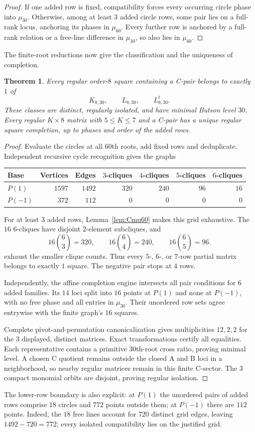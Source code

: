 \documentclass[11pt,a4paper]{article}
\newtheorem{theorem}{Theorem}[section]
\theoremstyle{plain}
\theoremstyle{definition}
\numberwithin{equation}{section}
\begin{document}
\begin{proof}
If one added row is fixed, compatibility forces every occurring circle phase into $\mu_{30}$. Otherwise, among at least $3$ added circle rows, some pair lies on a full-rank locus, anchoring its phases in $\mu_{60}$. Every further row is anchored by a full-rank relation or a free-line difference in $\mu_{30}$, so also lies in $\mu_{60}$.
\end{proof}
The finite-root reductions now give the classification and the uniqueness of completion.
\begin{theorem}\label{thm:Ccomplete}\label{cor:Cunique}
Every regular order-$8$ square containing a C-pair belongs to exactly $1$ of
$$K_{8,30},\qquad L_{8,30},\qquad L_{8,30}^{t}.$$
These classes are distinct, regularly isolated, and have minimal Butson level $30$. Every regular $K\times8$ matrix with $5\le K\le7$ and a C-pair has a unique regular square completion, up to phases and order of the added rows.
\end{theorem}
\begin{proof}
Evaluate the circles at all $60$th roots, add fixed rows and deduplicate. Independent recursive cycle recognition gives the graphs
\begin{center}\begin{tabular}{lrrrrrr}\toprule
Base&Vertices&Edges&$3$-cliques&$4$-cliques&$5$-cliques&$6$-cliques\\\midrule
$P(1)$&$1597$&$1492$&$320$&$240$&$96$&$16$\\
$P(-1)$&$372$&$112$&$0$&$0$&$0$&$0$\\\bottomrule
\end{tabular}\end{center}
For at least $3$ added rows, Lemma~\ref{lem:Cmu60} makes this grid exhaustive. The $16$ $6$-cliques have disjoint $2$-element subcliques, and
$$
16\binom63=320,\qquad
16\binom64=240,\qquad
16\binom65=96.
$$
exhaust the smaller clique counts. Thus every $5$-, $6$-, or $7$-row partial matrix belongs to exactly $1$ square. The negative pair stops at $4$ rows.

Independently, the affine completion engine intersects all pair conditions for $6$ added families. Its $14$ loci split into $16$ points at $P(1)$ and none at $P(-1)$, with no free phase and all entries in $\mu_{30}$. Their unordered row sets agree entrywise with the finite graph's $16$ squares.

Complete pivot-and-permutation canonicalization gives multiplicities $12,2,2$ for the $3$ displayed, distinct matrices. Exact transformations certify all equalities. Each representative contains a primitive $30$th-root cross ratio, proving minimal level. A chosen C quotient remains outside the closed A and B loci in a neighborhood, so nearby regular matrices remain in this finite C-sector. The $3$ compact monomial orbits are disjoint, proving regular isolation.
\end{proof}
The lower-row boundary is also explicit: at $P(1)$ the unordered pairs of added rows comprise $18$ circles and $772$ points outside them; at $P(-1)$ there are $112$ points. Indeed, the $18$ free lines account for $720$ distinct grid edges, leaving $1492-720=772$; every isolated compatibility lies on the justified grid.
\end{document}
